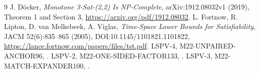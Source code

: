 \documentclass[11pt]{article}
\begin{document}
\begin{thebibliography}{9}
 J. D\"ocker, \emph{Monotone 3-Sat-(2,2) Is NP-Complete}, arXiv:1912.08032v1 (2019), Theorem 1 and Section 3, \url{https://arxiv.org/pdf/1912.08032}.
 L. Fortnow, R. Lipton, D. van Melkebeek, A. Viglas, \emph{Time-Space Lower Bounds for Satisfiability}, JACM 52(6):835--865 (2005), DOI:10.1145/1101821.1101822, \url{https://lance.fortnow.com/papers/files/tst.pdf}.
 LSPV-4, M22-UNPAIRED-ANCHOR96, .
 LSPV-2, M22-ONE-SIDED-FACTOR133, .
 LSPV-3, M22-MATCH-EXPANDER100, .
\end{thebibliography}
\end{document}
